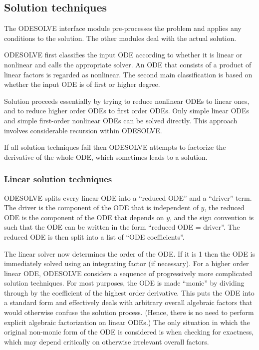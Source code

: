 \subsection{Solution techniques}

The ODESOLVE interface module pre-processes the problem and applies
any conditions to the solution.  The other modules deal with the
actual solution.

ODESOLVE first classifies the input ODE according to whether it
is linear or nonlinear and calls the appropriate solver.  An ODE that
consists of a product of linear factors is regarded as nonlinear.  The
second main classification is based on whether the input ODE is of
first or higher degree.

Solution proceeds essentially by trying to reduce nonlinear ODEs to
linear ones, and to reduce higher order ODEs to first order ODEs.
Only simple linear ODEs and simple first-order nonlinear ODEs can be
solved directly.  This approach involves considerable recursion within
ODESOLVE.

If all solution techniques fail then ODESOLVE attempts to
factorize the derivative of the whole ODE, which sometimes leads to a
solution.


\subsubsection{Linear solution techniques}

ODESOLVE splits every linear ODE into a ``reduced ODE'' and a
``driver'' term.  The driver is the component of the ODE that is
independent of $y$, the reduced ODE is the component of the ODE that
depends on $y$, and the sign convention is such that the ODE can be
written in the form ``reduced ODE = driver''.  The reduced ODE is then
split into a list of ``ODE coefficients''.

The linear solver now determines the order of the ODE\@.  If it is 1
then the ODE is immediately solved using an integrating factor (if
necessary).  For a higher order linear ODE, ODESOLVE considers a
sequence of progressively more complicated solution techniques.  For
most purposes, the ODE is made ``monic'' by dividing through by the
coefficient of the highest order derivative.  This puts the ODE into a
standard form and effectively deals with arbitrary overall algebraic
factors that would otherwise confuse the solution process.  (Hence,
there is no need to perform explicit algebraic factorization on linear
ODEs.)  The only situation in which the original non-monic form of the
ODE is considered is when checking for exactness, which may depend
critically on otherwise irrelevant overall factors.

